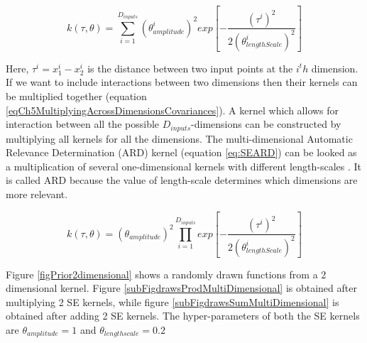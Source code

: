 \begin{equation}\label{eq:SESum}
k(\tau, \theta) = \sum_{i=1}^{D_{inputs}} (\theta_{amplitude}^{i})^2 exp\left [ -\frac{(\tau^{i})^2}{2(\theta_{lengthScale}^{i})^2} \right ]
\end{equation}

Here, $\tau^{i} = x^{i}_{1} - x^{i}_{2}$ is the distance between two input points at the $i^th$ dimension. If we want to include interactions between two dimensions then their kernels can be multiplied together (equation \ref{eqCh5MultiplyingAcrossDimensionsCovariances}). A kernel which allows for interaction between all the possible $D_{inputs}$-dimensions can be constructed by multiplying all kernels for all the dimensions. The multi-dimensional Automatic Relevance Determination (ARD) kernel (equation \ref{eq:SEARD}) can be looked as a multiplication of several one-dimensional kernels with different length-scales \cite{Rasmussen2005}. It is called ARD because the value of length-scale determines which dimensions are more relevant.

\begin{equation}\label{eq:SEARD}
k(\tau, \theta) = (\theta_{amplitude})^2 \prod_{i=1}^{D_{inputs}}  exp\left [ -\frac{(\tau^{i})^2}{2(\theta_{lengthScale}^{i})^2} \right ]
\end{equation}

Figure \ref{figPrior2dimensional} shows a randomly drawn functions from a 2 dimensional kernel. Figure \ref{subFigdrawsProdMultiDimensional} is obtained after multiplying 2 SE kernels, while figure \ref{subFigdrawsSumMultiDimensional} is obtained after adding 2 SE kernels. The hyper-parameters of both the SE kernels are $\theta_{amplitude}=1$ and $\theta_{lengthscale}=0.2$ 


